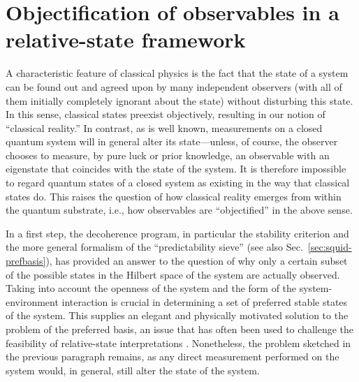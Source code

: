 \documentclass[twocolumn,aps,floatfix,amsmath,amssymb,showpacs,nofootinbib]{revtex4}
\begin{document}
\section{Objectification of observables in a relative-state framework}
\label{sec:object}

A characteristic feature of classical physics is the fact that the
state of a system can be found out and agreed upon by many independent
observers (with all of them initially completely ignorant about the
state) without disturbing this state. In this sense, classical states
preexist objectively, resulting in our notion of ``classical
reality.'' In contrast, as is well known, measurements on a closed
quantum system will in general alter its state---unless, of course,
the observer chooses to measure, by pure luck or prior knowledge, an
observable with an eigenstate that coincides with the state of the
system.  It is therefore impossible to regard quantum states of a
closed system as existing in the way that classical states do.  This raises
the question of how classical reality emerges from within the quantum
substrate, i.e., how observables are ``objectified'' in the above
sense.

In a first step, the decoherence program, in particular the stability
criterion and the more general formalism of the ``predictability
sieve''
\cite{Zurek:1981:dd,Zurek:1982:tv,Zurek:1993:pu,Zurek:1998:re,Zurek:2002:ii,%
  Schlosshauer:2003:tv} (see also Sec.~\ref{sec:squid-prefbasis}), has
provided an answer to the question of why only a certain subset of the
possible states in the Hilbert space of the system are actually
observed. Taking into account the openness of the system and the form
of the system-environment interaction is crucial in determining a set
of preferred stable states of the system. This supplies an elegant and
physically motivated solution to the problem of the preferred basis,
an issue that has often been used to challenge the feasibility of
relative-state interpretations \cite{Kent:1990:nm,Stapp:2002:pc}.
Nonetheless, the problem sketched in the previous paragraph remains,
as any direct measurement performed on the system would, in general,
still alter the state of the system.
\end{document}
